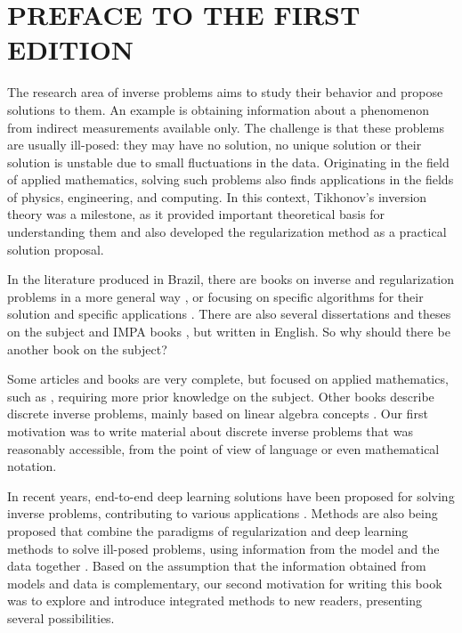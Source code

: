 \section*{\centering PREFACE TO THE FIRST EDITION}
The research area of inverse problems aims to study their behavior and propose solutions to them. An example is obtaining information about a phenomenon from indirect measurements available only. The challenge is that these problems are usually ill-posed: they may have no solution, no unique solution or their solution is unstable due to small fluctuations in the data. Originating in the field of applied mathematics, solving such problems also finds applications in the fields of physics, engineering, and computing. In this context, Tikhonov's inversion theory \cite{tikhonov1977solutions} was a milestone, as it provided important theoretical basis for understanding them and also developed the regularization method as a practical solution proposal.

In the literature produced in Brazil, there are books on inverse and regularization problems in a more general way \cite{Neto2005}, or focusing on specific algorithms for their solution \cite{Neto2016} and specific applications \cite{2016menin}. There are also several dissertations and theses on the subject and IMPA books \cite{baumeister2005topics, bleyer2015novel}, but written in English. So why should there be another book on the subject?

Some articles and books are very complete, but focused on applied mathematics, such as \cite{Benning2018, engl1996regularization}, requiring more prior knowledge on the subject. Other books describe discrete inverse problems, mainly based on linear algebra concepts \cite{aster2019parameter, hansen2010discrete, Mueller2012}. Our first motivation was to write material about discrete inverse problems that was reasonably accessible, from the point of view of language or even mathematical notation.

In recent years, end-to-end deep learning solutions have been proposed for solving inverse problems, contributing to various applications \cite{Adler2021, Bai2020, Belthangady2019, Koh2021, Ongie2020, Su2022}. Methods are also being proposed that combine the paradigms of regularization and deep learning methods to solve ill-posed problems, using information from the model and the data together \cite{Arridge2019}.  Based on the assumption that the information obtained from models and data is complementary, our second motivation for writing this book was to explore and introduce integrated methods to new readers, presenting several possibilities.

